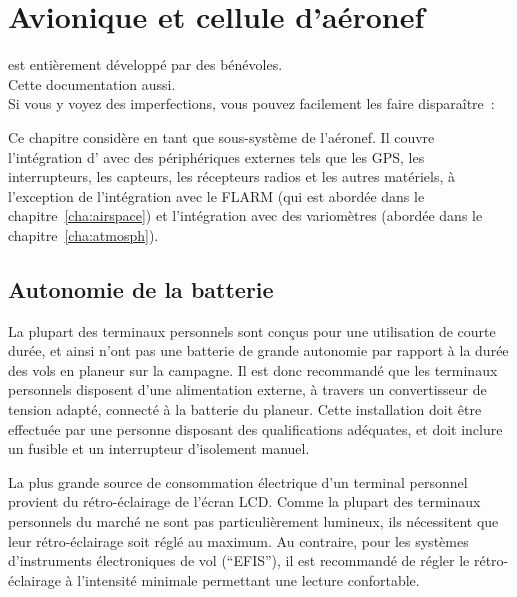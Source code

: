 
\chapter{Avionique et cellule d'aéronef}\label{cha:avionics-airframe}

\begin{framed}
	\begin{center}
		\xc{} est entièrement développé par des bénévoles.\\
		Cette documentation aussi.\\
		Si vous y voyez des imperfections, vous pouvez facilement les faire disparaître~:\\
	\end{center}
\end{framed}

Ce chapitre considère \xc{} en tant que sous-système de l'aéronef.
Il couvre l'intégration d'\xc{} avec des périphériques externes tels que les GPS, les interrupteurs, les capteurs, les récepteurs radios et les autres matériels, à l'exception de l'intégration avec le FLARM (qui est abordée dans le chapitre~\ref{cha:airspace}) et l'intégration avec des variomètres (abordée dans le chapitre~\ref{cha:atmosph}).

\section{Autonomie de la batterie}

La plupart des terminaux personnels sont conçus pour une utilisation de courte durée, et ainsi n'ont pas une batterie de grande autonomie par rapport à la durée des vols en planeur sur la campagne.
Il est donc recommandé que les terminaux personnels disposent d'une alimentation externe, à travers un convertisseur de tension adapté, connecté à la batterie du planeur.
Cette installation doit être effectuée par une personne disposant des qualifications adéquates, et doit inclure un fusible et un interrupteur d'isolement manuel.

La plus grande source de consommation électrique d'un terminal personnel provient du rétro-éclairage de l'écran LCD.
Comme la plupart des terminaux personnels du marché ne sont pas particulièrement lumineux, ils nécessitent que leur rétro-éclairage soit réglé au maximum.
Au contraire, pour les systèmes d'instruments électroniques de vol (``EFIS''), il est recommandé de régler le rétro-éclairage à l'intensité minimale permettant une lecture confortable.


